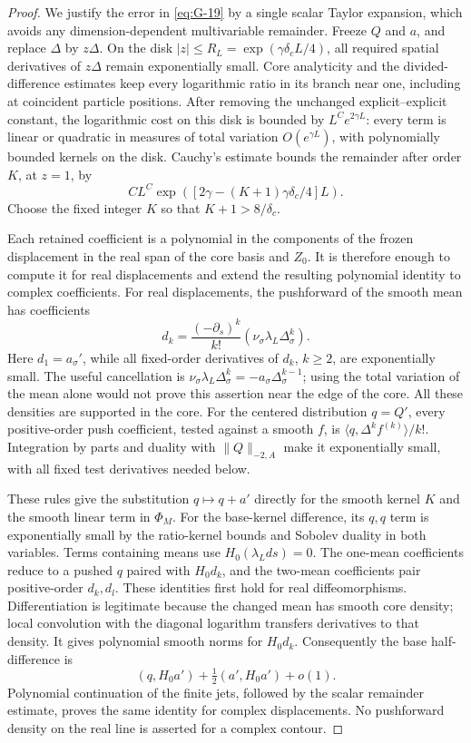 \begin{proof}
We justify the error in \eqref{eq:G-19} by a single scalar Taylor
expansion, which avoids any dimension-dependent multivariable
remainder. Freeze \(Q\) and \(a\), and replace \(\Delta\) by
\(z\Delta\). On the disk
\( |z|\le R_L=\exp(\gamma\delta_cL/4)\), all required spatial
derivatives of \(z\Delta\) remain exponentially small. Core
analyticity and the divided-difference estimates keep every logarithmic
ratio in its branch near one, including at coincident particle
positions. After removing the unchanged explicit--explicit constant,
the logarithmic cost on this disk is bounded by
\(L^C e^{2\gamma L}\): every term is linear or quadratic in measures
of total variation \(O(e^{\gamma L})\), with polynomially bounded
kernels on the disk. Cauchy's estimate bounds the remainder after
order \(K\), at \(z=1\), by
\[
 C L^C\exp\!\left(\left[2\gamma-
              (K+1)\gamma\delta_c/4\right]L\right).
\]
Choose the fixed integer \(K\) so that \(K+1>8/\delta_c\).

Each retained coefficient is a polynomial in the components of the
frozen displacement in the real span of the core basis and \(Z_0\).
It is therefore enough to compute it for real displacements and extend
the resulting polynomial identity to complex coefficients. For real
displacements, the pushforward of the smooth mean has coefficients
\[
 d_k=\frac{(-\partial_s)^k}{k!}
               (\nu_\sigma\lambda_L\Delta_\sigma^k).
\]
Here \(d_1=a_\sigma'\), while all fixed-order derivatives of \(d_k\),
\(k\ge2\), are exponentially small. The useful cancellation is
\(\nu_\sigma\lambda_L\Delta_\sigma^k=-a_\sigma\Delta_\sigma^{k-1}\);
using the total variation of the mean alone would not prove this
assertion near the edge of the core. All these densities are supported
in the core. For the centered distribution \(q=Q'\), every
positive-order push coefficient, tested against a smooth \(f\), is
\(\langle q,\Delta^k f^{(k)}\rangle/k!\). Integration by parts and
duality with \(\|Q\|_{-2,A}\) make it exponentially small, with all
fixed test derivatives needed below.

These rules give the substitution \(q\mapsto q+a'\) directly for the
smooth kernel \(K\) and the smooth linear term in \(\Phi_M\).
For the base-kernel difference, its \(q,q\) term is exponentially
small by the ratio-kernel bounds and Sobolev duality in both variables.
Terms containing means use \(H_0(\lambda_Lds)=0\). The one-mean
coefficients reduce to a pushed \(q\) paired with \(H_0d_k\),
and the two-mean coefficients pair positive-order \(d_k,d_l\).
These identities first hold for real diffeomorphisms. Differentiation
is legitimate because the changed mean has smooth core density;
local convolution with the diagonal logarithm transfers derivatives
to that density. It gives polynomial smooth norms for \(H_0d_k\).
Consequently the base half-difference is
\[
 (q,H_0a')+\tfrac12(a',H_0a')+o(1).
\]
Polynomial continuation of the finite jets, followed by the scalar
remainder estimate, proves the same identity for complex displacements.
No pushforward density on the real line is asserted for a complex
contour.


\end{proof}
